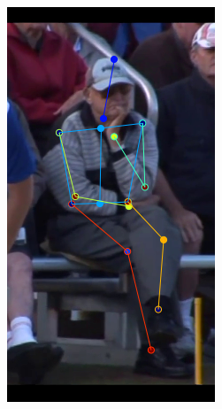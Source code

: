 \begin{figure}[t!]
\begin{subfigure}[b]{0.115\textwidth}
    \end{subfigure}
    \hfill
    \begin{subfigure}[b]{0.115\textwidth}
            \includegraphics[width=\textwidth]{resources/MotivativeAnnotation/MPII/bad_anno-2}
    \end{subfigure}
  	\hfill
    \begin{subfigure}[b]{0.115\textwidth}

\end{subfigure}
\end{figure}
